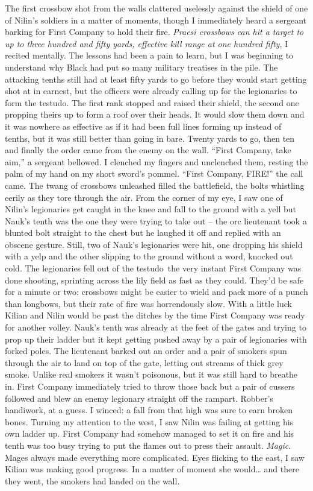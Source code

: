 \documentclass[12pt, openany]{book}
\begin{document}
The first crossbow shot from the walls clattered uselessly against the shield of one of Nilin’s soldiers in a matter of moments, though I immediately heard a sergeant barking for First Company to hold their fire. \textit{Praesi crossbows can hit a target to up to three hundred and fifty yards, effective kill range at one hundred fifty}, I recited mentally. The lessons had been a pain to learn, but I was beginning to understand why Black had put so many military treatises in the pile. The attacking tenths still had at least fifty yards to go before they would start getting shot at in earnest, but the officers were already calling up for the legionaries to form the testudo. The first rank stopped and raised their shield, the second one propping theirs up to form a roof over their heads. It would slow them down and it was nowhere as effective as if it had been full lines forming up instead of tenths, but it was still better than going in bare. Twenty yards to go, then ten and finally the order came from the enemy on the wall.
“First Company, take aim,” a sergeant bellowed.
I clenched my fingers and unclenched them, resting the palm of my hand on my short sword’s pommel.
“First Company, FIRE!” the call came.
The twang of crossbows unleashed filled the battlefield, the bolts whistling eerily as they tore through the air. From the corner of my eye, I saw one of Nilin’s legionaries get caught in the knee and fall to the ground with a yell but Nauk’s tenth was the one they were trying to take out – the orc lieutenant took a blunted bolt straight to the chest but he laughed it off and replied with an obscene gesture. Still, two of Nauk’s legionaries were hit, one dropping his shield with a yelp and the other slipping to the ground without a word, knocked out cold. The legionaries fell out of the testudo the very instant First Company was done shooting, sprinting across the lily field as fast as they could. They’d be safe for a minute or two: crossbows might be easier to wield and pack more of a punch than longbows, but their rate of fire was horrendously slow. With a little luck Kilian and Nilin would be past the ditches by the time First Company was ready for another volley.
Nauk’s tenth was already at the feet of the gates and trying to prop up their ladder but it kept getting pushed away by a pair of legionaries with forked poles. The lieutenant barked out an order and a pair of smokers spun through the air to land on top of the gate, letting out streams of thick grey smoke. Unlike real smokers it wasn’t poisonous, but it was still hard to breathe in. First Company immediately tried to throw those back but a pair of cussers followed and blew an enemy legionary straight off the rampart. Robber’s handiwork, at a guess. I winced: a fall from that high was sure to earn broken bones. Turning my attention to the west, I saw Nilin was failing at getting his own ladder up. First Company had somehow managed to set it on fire and his tenth was too busy trying to put the flames out to press their assault. \textit{Magic}. Mages always made everything more complicated. Eyes flicking to the east, I saw Kilian was making good progress. In a matter of moment she would… and there they went, the smokers had landed on the wall.
\end{document}
